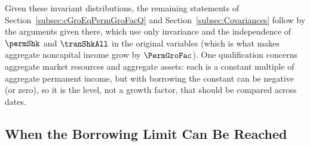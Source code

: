 \documentclass[\econtexRoot/BufferStockTheory]{subfiles}
\begin{document}
Given these invariant distributions, the remaining statements of Section~\ref{subsec:cGroEqPermGroFacQ} and Section~\ref{subsec:Covariances} follow by the arguments given there, which use only invariance and the independence of $\permShk$ and $\tranShkAll$ in the original variables (which is what makes aggregate noncapital income grow by $\PermGroFac$).
One qualification concerns aggregate market resources and aggregate assets: each is a constant multiple of aggregate permanent income, but with borrowing the constant can be negative (or zero), so it is the level, not a growth factor, that should be compared across dates.

\subsection{When the Borrowing Limit Can Be Reached}\label{subsec:PositiveMinimumNoWorstEvent}
\end{document}
